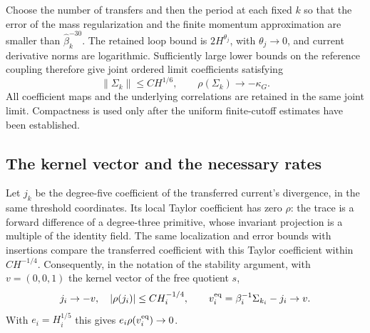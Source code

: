 Choose the number of transfers and then the period at each fixed $k$ so
that the error of the mass regularization and the finite momentum approximation are
smaller than $\widehat\beta_k^{-30}$. The retained loop bound is
$2H^{\theta_j}$, with $\theta_j\to0$, and current derivative norms
are logarithmic. Sufficiently large lower bounds on the reference coupling therefore give joint ordered limit
coefficients satisfying
\begin{equation}\label{ch17:sigma-bound}
 \|\Sigma_k\|\le C H^{1/6},\qquad
 \rho(\Sigma_k)\longrightarrow-\kappa_G.
\end{equation}
All coefficient maps and the underlying correlations are retained
in the same joint limit. Compactness is used only after the uniform
finite-cutoff estimates have been established.

\subsection{The kernel vector and the necessary rates}

Let $j_k$ be the degree-five coefficient of the transferred current's
divergence, in the same threshold coordinates. Its local Taylor
coefficient has zero $\rho$: the trace is a forward difference of a
degree-three primitive, whose invariant projection is a multiple of the identity field.
The same localization and error bounds with insertions compare the transferred
coefficient with this Taylor coefficient within $CH^{-1/4}$.
Consequently, in the notation of the stability argument, with $v=(0,0,1)$ the kernel vector of the free quotient $s$,
\[
 j_i\to-v,\quad |\rho(j_i)|\le CH_i^{-1/4},\qquad
 v_i^{\rm eq}=\beta_i^{-1}\Sigma_{k_i}-j_i\to v.
\]
With $e_i=H_i^{1/5}$ this gives $e_i\rho(v_i^{\rm eq})\to0$.

